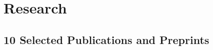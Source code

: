 \documentclass[11pt,a4paper,sans]{moderncv}        %
\begin{document}

\section{Research}



\vspace{5pt}

\subsection{10 Selected Publications and Preprints}

\end{document}

